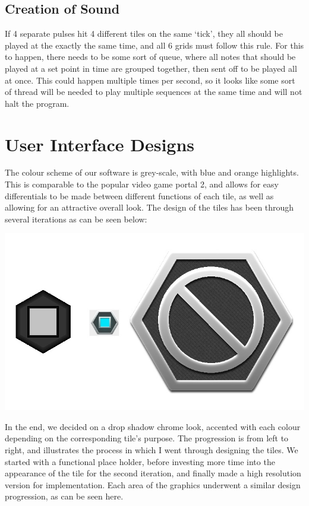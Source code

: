 \documentclass[10pt,a4paper]{article}
\begin{document}
\subsection{Creation of Sound}
If 4 separate pulses hit 4 different tiles on the same ‘tick’, they all should be played at the exactly the same time, and all 6 grids must follow this rule. For this to happen, there needs to be some sort of queue, where all notes that should be played at a set point in time are grouped together, then sent off to be played all at once. This could happen multiple times per second, so it looks like some sort of thread will be needed to play multiple sequences at the same time and will not halt the program.

\section{User Interface Designs}
The colour scheme of our software is grey-scale, with blue and orange highlights. This is comparable to the popular video game portal 2, and allows for easy differentials to be made between different functions of each tile, as well as allowing for an attractive overall look. The design of the tiles has been through several iterations as can be seen below:
\begin{center}
\includegraphics[scale=0.5]{tileprogression.jpg}
\end{center}
In the end, we decided on a drop shadow chrome look, accented with each colour depending on the corresponding tile's purpose. The progression is from left to right, and illustrates the process in which I went through designing the tiles. We started with a functional place holder, before investing more time into the appearance of the tile for the second iteration, and finally made a high resolution version for implementation. Each area of the graphics underwent a similar design progression, as can be seen here.\\
\end{document}
